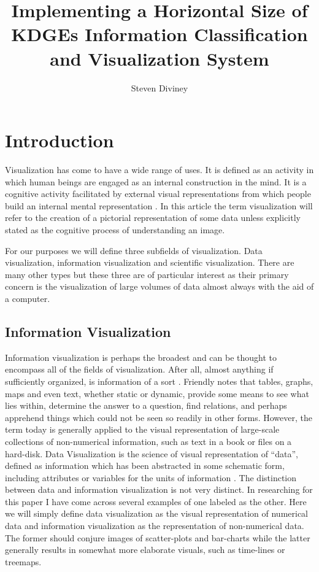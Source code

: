 \documentclass[a4paper, 10pt, titlepage]{article}
\title{Implementing a Horizontal Size of KDGEs Information Classification and Visualization System}
\author{Steven Diviney}
\begin{document}
\maketitle

\newpage

 
\section{Introduction}
Visualization has come to have a wide range of uses. It is defined as an activity in which human beings are engaged as an internal construction in the mind. It is a cognitive activity facilitated by external visual representations from which people build an internal mental representation \cite{spence2001information}. In this article the term visualization will refer to the creation of a pictorial representation of some data unless explicitly stated as the cognitive process of understanding an image. 

For our purposes we will define three subfields of visualization. Data visualization, information visualization and scientific visualization. There are many other types but these three are of particular interest as their primary concern is the visualization of large volumes of data almost always with the aid of a computer.
\subsection{Information Visualization}
Information visualization is perhaps the broadest and can be thought to encompass all of the fields of visualization. After all, almost anything if sufficiently organized, is information of a sort \cite{friendly2001milestones}. Friendly notes that tables, graphs, maps and even text, whether static or dynamic, provide some means to see what lies within, determine the answer to a question, find relations, and perhaps apprehend things which could not be seen so readily in other forms. However, the term today is generally applied to the visual representation of large-scale collections of non-numerical information, such as text in a book or files on a hard-disk.
Data Visualization is the science of visual representation of “data”, defined as information which has been abstracted in some schematic form, including attributes or variables for the units of information \cite{friendly2001milestones}. The distinction between data and information visualization is not very distinct. In researching for this paper I have come across several examples of one labeled as the other. Here we will simply define data visualization as the visual representation of numerical data and information visualization as the representation of non-numerical data. The former should conjure images of scatter-plots and bar-charts while the latter generally results in somewhat more elaborate visuals, such as time-lines or treemaps.
\end{document}
